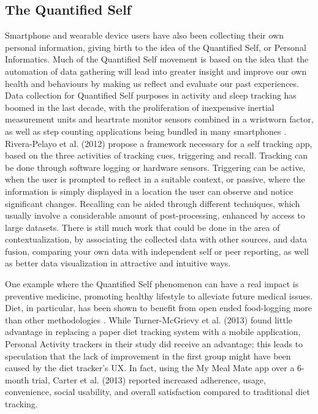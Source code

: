 \subsection{The Quantified Self}
Smartphone and wearable device users have also been collecting their own personal information, giving birth to the idea of the Quantified Self, or Personal Informatics. \cite{rapp2014}
Much of the Quantified Self movement is based on the idea that the automation of data gathering will lead into greater insight and improve our own health and behaviours by making us reflect and evaluate our past experiences. Data collection for Quantified Self purposes in activity and sleep tracking has boomed in the last decade, with the proliferation of inexpensive inertial measurement units and heartrate monitor sensors combined in a wristworn factor, as well as step counting applications being bundled in many smartphones \cite{Crawford2015}.\\
Rivera-Pelayo et al. (2012)\cite{Rivera-Pelayo2012} propose a framework necessary for a self tracking app, based on the three activities of tracking cues, triggering and recall.
Tracking can be done through software logging or hardware sensors. Triggering can be active, when the user is prompted to reflect in a suitable context, or passive, where the information is simply displayed in a location the user can observe and notice significant changes. Recalling can be aided through different techniques, which usually involve a considerable amount of post-processing, enhanced by access to large datasets. There is still much work that could be done in the area of contextualization, by associating the collected data with other sources, and data fusion, comparing your own data with independent self or peer reporting, as well as better data visualization in attractive and intuitive ways.

One example where the Quantified Self phenomenon can have a real impact is preventive medicine, promoting healthy lifestyle to alleviate future medical issues. Diet, in particular, has been shown to benefit from open ended food-logging more than other methodologies \cite{Bingham1994}. While Turner-McGrievy et al. (2013)\cite{Turner-McGrievy2013} found little advantage in replacing a paper diet tracking system with a mobile application, Personal Activity trackers in their study did receive an advantage; this leads to speculation that the lack of improvement in the first group might have been caused by the diet tracker's UX. In fact, using the My Meal Mate app over a 6-month trial, Carter et al. (2013)\cite{carter2013adherence} reported increased adherence, usage, convenience, social usability, and overall satisfaction compared to traditional diet tracking. 

